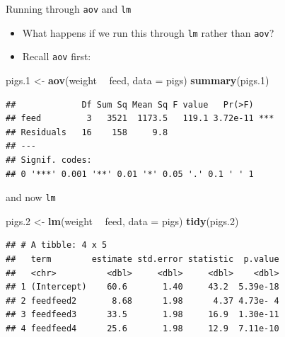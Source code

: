 \documentclass[ignorenonframetext,]{beamer}
\newenvironment{Shaded}{\begin{snugshade}}{\end{snugshade}}
\newcommand{\DataTypeTok}[1]{\textcolor[rgb]{0.13,0.29,0.53}{#1}}
\newcommand{\FloatTok}[1]{\textcolor[rgb]{0.00,0.00,0.81}{#1}}
\newcommand{\KeywordTok}[1]{\textcolor[rgb]{0.13,0.29,0.53}{\textbf{#1}}}
\newcommand{\NormalTok}[1]{#1}
\newcommand{\OperatorTok}[1]{\textcolor[rgb]{0.81,0.36,0.00}{\textbf{#1}}}
\newcommand{\StringTok}[1]{\textcolor[rgb]{0.31,0.60,0.02}{#1}}
\providecommand{\tightlist}{%
  \setlength{\itemsep}{0pt}\setlength{\parskip}{0pt}}
\begin{document}
\begin{frame}[fragile]{Running through \texttt{aov} and \texttt{lm}}
\protect\hypertarget{running-through-aov-and-lm}{}

\begin{itemize}
\tightlist
\item
  What happens if we run this through \texttt{lm} rather than
  \texttt{aov}?
\item
  Recall \texttt{aov} first:
\end{itemize}

\begin{Shaded}
\begin{Highlighting}[]
\NormalTok{pigs}\FloatTok{.1}\NormalTok{ <-}\StringTok{ }\KeywordTok{aov}\NormalTok{(weight }\OperatorTok{~}\StringTok{ }\NormalTok{feed, }\DataTypeTok{data =}\NormalTok{ pigs)}
\KeywordTok{summary}\NormalTok{(pigs}\FloatTok{.1}\NormalTok{)}
\end{Highlighting}
\end{Shaded}

\begin{verbatim}
##             Df Sum Sq Mean Sq F value   Pr(>F)    
## feed         3   3521  1173.5   119.1 3.72e-11 ***
## Residuals   16    158     9.8                     
## ---
## Signif. codes:  
## 0 '***' 0.001 '**' 0.01 '*' 0.05 '.' 0.1 ' ' 1
\end{verbatim}

\end{frame}

\begin{frame}[fragile]{and now \texttt{lm}}
\protect\hypertarget{and-now-lm}{}

\begin{Shaded}
\begin{Highlighting}[]
\NormalTok{pigs}\FloatTok{.2}\NormalTok{ <-}\StringTok{ }\KeywordTok{lm}\NormalTok{(weight }\OperatorTok{~}\StringTok{ }\NormalTok{feed, }\DataTypeTok{data =}\NormalTok{ pigs)}
\KeywordTok{tidy}\NormalTok{(pigs}\FloatTok{.2}\NormalTok{)}
\end{Highlighting}
\end{Shaded}

\begin{verbatim}
## # A tibble: 4 x 5
##   term        estimate std.error statistic  p.value
##   <chr>          <dbl>     <dbl>     <dbl>    <dbl>
## 1 (Intercept)    60.6       1.40     43.2  5.39e-18
## 2 feedfeed2       8.68      1.98      4.37 4.73e- 4
## 3 feedfeed3      33.5       1.98     16.9  1.30e-11
## 4 feedfeed4      25.6       1.98     12.9  7.11e-10
\end{verbatim}

\end{frame}
\end{document}

